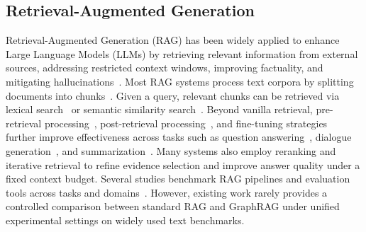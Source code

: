 \subsection{Retrieval-Augmented Generation}
Retrieval-Augmented Generation (RAG) has been widely applied to enhance Large Language Models (LLMs) by retrieving relevant information from external sources, addressing restricted context windows, improving factuality, and mitigating hallucinations~\cite{fan2024survey, gao2023retrieval}. 
Most RAG systems process text corpora by splitting documents into chunks~\cite{finardi2024chronicles}. 
Given a query, relevant chunks can be retrieved via lexical search~\cite{ram2023context} or semantic similarity search~\cite{karpukhin2020dense}. 
Beyond vanilla retrieval, pre-retrieval processing~\cite{ma2023query, zheng2023take}, post-retrieval processing~\cite{dong2024don, xu2023recomp}, and fine-tuning strategies~\cite{li2023structure} further improve effectiveness across tasks such as question answering~\cite{yan2024corrective}, dialogue generation~\cite{izacard2023atlas}, and summarization~\cite{jiang2023active}. 
Many systems also employ reranking and iterative retrieval to refine evidence selection and improve answer quality under a fixed context budget. Several studies benchmark RAG pipelines and evaluation tools across tasks and domains~\cite{yu2024evaluation, chen2024benchmarking, es2023ragas}. 
However, existing work rarely provides a controlled comparison between standard RAG and GraphRAG under unified experimental settings on widely used text benchmarks.

\vspace{-0.1in}

